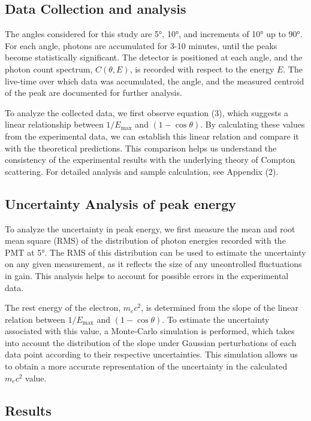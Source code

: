 \subsection{Data Collection and analysis}

The angles considered for this study are 5°, 10°, and increments of 10° up to 90°. For each angle, photons are accumulated for 3-10 minutes, until the peaks become statistically significant. The detector is positioned at each angle, and the photon count spectrum, $C(\theta, E)$, is recorded with respect to the energy $E$. The live-time over which data was accumulated, the angle, and the measured centroid of the peak are documented for further analysis.

To analyze the collected data, we first observe equation (3), which suggests a linear relationship between $1/E_{\max}$ and $(1 - \cos\theta)$. By calculating these values from the experimental data, we can establish this linear relation and compare it with the theoretical predictions. This comparison helps us understand the consistency of the experimental results with the underlying theory of Compton scattering. For detailed analysis and sample calculation, see Appendix (2).



\subsection{Uncertainty Analysis of peak energy}

To analyze the uncertainty in peak energy, we first measure the mean and root mean square (RMS) of the distribution of photon energies recorded with the PMT at 5°. The RMS of this distribution can be used to estimate the uncertainty on any given measurement, as it reflects the size of any uncontrolled fluctuations in gain. This analysis helps to account for possible errors in the experimental data.

The rest energy of the electron, $m_ec^2$, is determined from the slope of the linear relation between $1/E_{\max}$ and $(1 - \cos\theta)$. To estimate the uncertainty associated with this value, a Monte-Carlo simulation is performed, which takes into account the distribution of the slope under Gaussian perturbations of each data point according to their respective uncertainties. This simulation allows us to obtain a more accurate representation of the uncertainty in the calculated $m_ec^2$ value.

\subsection{Results}

